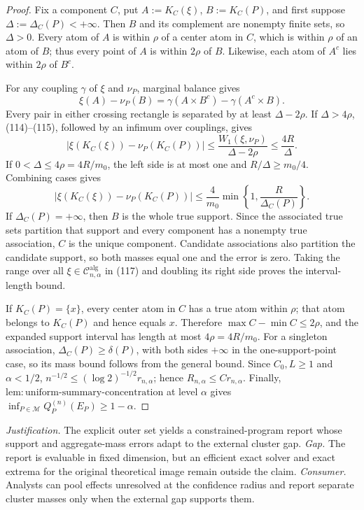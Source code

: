 \documentclass{article}
\begin{document}
\begin{proof}
Fix a component \(C\), put \(A:=K_C(\xi)\), \(B:=K_C(P)\), and first suppose \(\Delta:=\Delta_C(P)<+\infty\).  Then \(B\) and its complement are nonempty finite sets, so \(\Delta>0\).  Every atom of \(A\) is within \(\rho\) of a center atom in \(C\), which is within \(\rho\) of an atom of \(B\); thus every point of \(A\) is within \(2\rho\) of \(B\).  Likewise, each atom of \(A^c\) lies within \(2\rho\) of \(B^c\).

For any coupling \(\gamma\) of \(\xi\) and \(\nu_P\), marginal balance gives
\[
\xi(A)-\nu_P(B)
=\gamma(A\times B^c)-\gamma(A^c\times B).                            \tag{115}
\]
Every pair in either crossing rectangle is separated by at least \(\Delta-2\rho\).  If \(\Delta>4\rho\), (114)--(115), followed by an infimum over couplings, gives
\[
|\xi(K_C(\xi))-\nu_P(K_C(P))|
\le\frac{W_1(\xi,\nu_P)}{\Delta-2\rho}
\le\frac{4R}{\Delta}.                                                \tag{116}
\]
If \(0<\Delta\le4\rho=4R/m_0\), the left side is at most one and \(R/\Delta\ge m_0/4\).  Combining cases gives
\[
|\xi(K_C(\xi))-\nu_P(K_C(P))|
\le\frac{4}{m_0}\min\!\left\{1,\frac{R}{\Delta_C(P)}\right\}.     \tag{117}
\]
If \(\Delta_C(P)=+\infty\), then \(B\) is the whole true support.  Since the associated true sets partition that support and every component has a nonempty true association, \(C\) is the unique component.  Candidate associations also partition the candidate support, so both masses equal one and the error is zero.  Taking the range over all \(\xi\in\mathcal C^{\mathrm{alg}}_{n,\alpha}\) in (117) and doubling its right side proves the interval-length bound.

If \(K_C(P)=\{x\}\), every center atom in \(C\) has a true atom within \(\rho\); that atom belongs to \(K_C(P)\) and hence equals \(x\).  Therefore \(\max C-\min C\le2\rho\), and the expanded support interval has length at most \(4\rho=4R/m_0\).  For a singleton association, \(\Delta_C(P)\ge\delta(P)\), with both sides \(+\infty\) in the one-support-point case, so its mass bound follows from the general bound.  Since \(C_0,L\ge1\) and \(\alpha<1/2\), \(n^{-1/2}\le(\log2)^{-1/2}r_{n,\alpha}\); hence \(R_{n,\alpha}\le C r_{n,\alpha}\).  Finally, \(\mathrm{lem:uniform\text{-}summary\text{-}concentration}\) at level \(\alpha\) gives \(\inf_{P\in\mathcal M}Q_P^{(n)}(E_P)\ge1-\alpha\).
\end{proof}
\par\smallskip\noindent \textit{Justification.} The explicit outer set yields a constrained-program report whose support and aggregate-mass errors adapt to the external cluster gap. \textit{Gap.} The report is evaluable in fixed dimension, but an efficient exact solver and exact extrema for the original theoretical image remain outside the claim. \textit{Consumer.} Analysts can pool effects unresolved at the confidence radius and report separate cluster masses only when the external gap supports them.
\end{document}

